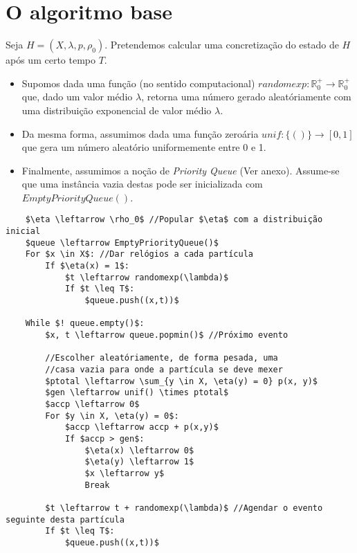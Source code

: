 \documentclass{article}
\newcommand{\R}{\mathbb{R}}
\begin{document}
	\section{O algoritmo base}
	
	Seja $H = (X, \lambda, p, \rho_0)$. Pretendemos calcular uma concretização do estado de $H$ após um certo tempo $T$.
	
	\begin{itemize}
	\item Supomos dada uma função (no sentido computacional) ${randomexp : \R^+_0 \rightarrow \R^+_0}$ que, dado um valor médio $\lambda$, retorna uma número gerado aleatóriamente com uma distribuição exponencial de valor médio $\lambda$.
	
	\item Da mesma forma, assumimos dada uma função zeroária $unif : \{()\} \rightarrow [0,1]$ que gera um número aleatório uniformemente entre 0 e 1.
	
	\item Finalmente, assumimos a noção de \emph{Priority Queue} (Ver anexo). Assume-se que uma instância vazia destas pode ser inicializada com $EmptyPriorityQueue()$.
	\end{itemize}
	
	\begin{minipage}{\linewidth}
	\begin{lstlisting}
	$\eta \leftarrow \rho_0$ //Popular $\eta$ com a distribuição inicial
	$queue \leftarrow EmptyPriorityQueue()$
	For $x \in X$: //Dar relógios a cada partícula
		If $\eta(x) = 1$:
			$t \leftarrow randomexp(\lambda)$
			If $t \leq T$:
				$queue.push((x,t))$

	While $! queue.empty()$:
		$x, t \leftarrow queue.popmin()$ //Próximo evento
		
		//Escolher aleatóriamente, de forma pesada, uma
		//casa vazia para onde a partícula se deve mexer
		$ptotal \leftarrow \sum_{y \in X, \eta(y) = 0} p(x, y)$
		$gen \leftarrow unif() \times ptotal$
		$accp \leftarrow 0$
		For $y \in X, \eta(y) = 0$:
			$accp \leftarrow accp + p(x,y)$
			If $accp > gen$:
				$\eta(x) \leftarrow 0$
				$\eta(y) \leftarrow 1$
				$x \leftarrow y$
				Break
		
		$t \leftarrow t + randomexp(\lambda)$ //Agendar o evento seguinte desta partícula
		If $t \leq T$:
			$queue.push((x,t))$
	\end{lstlisting}
	\end{minipage}
	
	\bigskip
	
\end{document}
